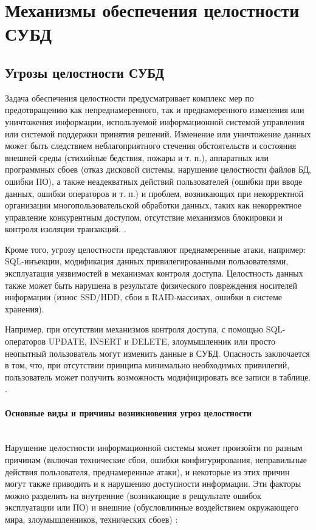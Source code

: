 \section{Механизмы обеспечения целостности СУБД}

\subsection{Угрозы целостности СУБД}
Задача обеспечения целостности предусматривает комплекс мер по предотвращению как непреднамеренного, так и преднамеренного изменения или уничтожения информации, используемой информационной системой управления или системой поддержки принятия решений. Изменение или уничтожение данных может быть следствием неблагоприятного стечения обстоятельств и состояния внешней среды (стихийные бедствия, пожары и т. п.), аппаратных или программных сбоев (отказ дисковой системы, нарушение целостности файлов БД, ошибки ПО), а также неадекватных действий пользователей (ошибки при вводе данных, ошибки операторов и т. п.) и проблем, возникающих при некорректной организации многопользовательской обработки данных, таких как некорректное управление конкурентным доступом, отсутствие механизмов блокировки и контроля изоляции транзакций. \autocite{Lihonosov2011, postgredoc1}.

Кроме того, угрозу целостности представляют преднамеренные атаки, например: SQL-инъекции, модификация данных привилегированными пользователями, эксплуатация уязвимостей в механизмах контроля доступа. Целостность данных также может быть нарушена в результате физического повреждения носителей информации (износ SSD/HDD, сбои в RAID-массивах, ошибки в системе хранения).

Например, при отсутствии механизмов контроля доступа, с помощью SQL-операторов UPDATE, INSERT и DELETE, злоумышленник или просто неопытный пользователь могут изменить данные в СУБД. Опасность заключается в том, что, при отсутствии принципа минимально необходимых привилегий, пользователь может получить возможность модифицировать все записи в таблице.  \autocite{Utebov2008, nist80012}.

\paragraph{Основные виды и причины возникновения угроз целостности} ~\\

Нарушение целостности информационной системы может произойти по разным причинам (включая технические сбои, ошибки конфигурирования, неправильные действия пользователя, преднамеренные атаки), и некоторые из этих причин могут также приводить и к нарушению доступности информации. \autocite{Pirogov2009}
Эти факторы можно разделить на внутренние (возникающие в рещультате ошибок эксплуатации или ПО) и внешние (обусловлинные воздействием окружающего мира, злоумышленников, технических сбоев) \autocites{IntuitThreats, HabrCloudThreats, WikiExploit, KasperskyDailyOAuth}:

